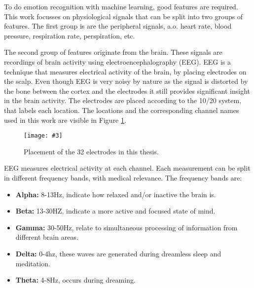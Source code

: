 \documentclass[12pt,journal,compsoc]{IEEEtran}
\newcommand{\npar}{\par \vspace{2.3ex plus 0.3ex minus 0.3ex}}
\newcommand{\mijnfiguur}[4][H]{            %
    \begin{figure}[#1]                      %
        \begin{center}                      %
            \texttt{[image: \#3]}        %
            \caption{#4\label{#3}}          %
        \end{center}
    \end{figure}
    }
\begin{document}
\npar

To do emotion recognition with machine learning, good features are required. This work focusses on physiological signals that can be split into two groups of features. The first group is are the peripheral signals, a.o. heart rate, blood pressure, respiration rate, perspiration, etc. 

\npar

The second group of features originate from the brain. These signals are recordings of brain activity using electroencephalography (EEG). EEG is a technique that measures electrical activity of the brain, by placing electrodes on the scalp\cite{ExtendedPaper}. Even though EEG is very noisy by nature as the signal is distorted by the bone between the cortex and the electrodes it still provides significant insight in the brain activity\cite{GivenPaper}. The electrodes are placed according to the 10/20 system, that labels each location. The locations and the corresponding channel names used in this work are visible in Figure \ref{1020labels}.

\mijnfiguur{width=0.5\textwidth}{1020labels}{Placement of the 32 electrodes in this thesis.\cite{1020Site}}

EEG measures electrical activity at each channel. Each measurement can be split in different frequency bands, with medical relevance\cite{EmotionRelativePower,WavesSite}. The frequency bands are:
\begin{itemize}
\item \textbf{Alpha:} 8-13Hz, indicate how relaxed and/or inactive the brain is.
\item \textbf{Beta:} 13-30HZ, indicate a more active and focused state of mind.
\item \textbf{Gamma:} 30-50Hz, relate to simultaneous processing of information from different brain areas.
\item \textbf{Delta:} 0-4hz, these waves are generated during dreamless sleep and meditation.
\item \textbf{Theta:} 4-8Hz, occurs during dreaming.
\end{itemize}

\end{document}

